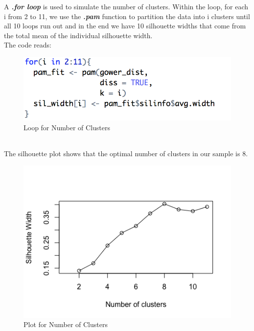 \documentclass[a4paper,12pt,fleqn]{article}
\begin{document}
A \textbf{\textit{.for loop}} is used to simulate the number of clusters. Within the loop, for each i from 2 to 11, we use the \textbf{\textit{.pam}} function to partition the data into i clusters until all 10 loops run out and in the end we have 10 silhouette widths that come from the total mean of the individual silhouette width. \\
The code reads:
\begin{figure}[h]
	\centering
	\includegraphics[width=0.6\linewidth]{"10.loop for number of clusters"}
	\caption{Loop for Number of Clusters}
	\label{fig:10}
\end{figure}\\
The silhouette plot shows that the optimal number of clusters in our sample is 8.\\
\begin{figure}[h]
	\centering
	\includegraphics[width=0.53\linewidth]{"11.plot for number of clusters"}
	\caption{Plot for Number of Clusters}
	\label{fig:11}
\end{figure}\\
\end{document}
